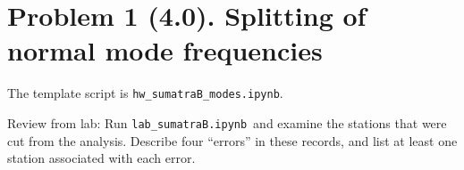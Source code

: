 \documentclass[11pt,titlepage,fleqn]{article}
\newcommand{\tfilemodes}{{\tt hw\_sumatraB\_modes.ipynb}}
\newcommand{\tfilelab}{{\tt lab\_sumatraB.ipynb}}
\begin{document}




\pagebreak
\section*{Problem 1 (4.0). Splitting of normal mode frequencies}

The template script is \tfilemodes.

\medskip\noindent
Review from lab: Run \tfilelab\ and examine the stations that were cut from the analysis. Describe four ``errors'' in these records, and list at least one station associated with each error.

\end{document}
